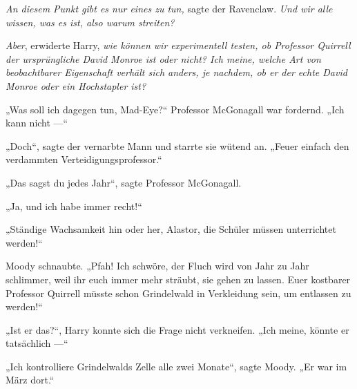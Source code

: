 \emph{An diesem Punkt gibt es nur eines zu tun,} sagte der Ravenclaw. \emph{Und wir alle wissen, was es ist, also warum streiten?}

\emph{Aber}, erwiderte Harry, \emph{wie können wir experimentell testen, ob Professor Quirrell der ursprüngliche David Monroe ist oder nicht? Ich meine, welche Art von beobachtbarer Eigenschaft verhält sich anders, je nachdem, ob er der echte David Monroe oder ein Hochstapler ist?}

„Was soll ich dagegen tun, Mad-Eye?“ Professor McGonagall war fordernd.
„Ich kann nicht —“

„Doch“, sagte der vernarbte Mann und starrte sie wütend an.
„Feuer einfach den verdammten Verteidigungsprofessor.“

„Das sagst du jedes Jahr“, sagte Professor McGonagall.

„Ja, und ich habe immer recht!“

„Ständige Wachsamkeit hin oder her, Alastor, die Schüler müssen unterrichtet werden!“

Moody schnaubte.
„Pfah! Ich schwöre, der Fluch wird von Jahr zu Jahr schlimmer, weil ihr euch immer mehr sträubt, sie gehen zu lassen. Euer kostbarer Professor Quirrell müsste schon Grindelwald in Verkleidung sein, um entlassen zu werden!“

„Ist er das?“, Harry konnte sich die Frage nicht verkneifen.
„Ich meine, könnte er tatsächlich —“

„Ich kontrolliere Grindelwalds Zelle alle zwei Monate“, sagte Moody.
„Er war im März dort.“

